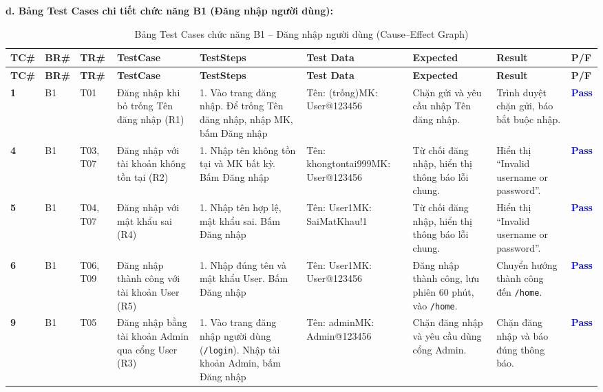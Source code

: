 \documentclass[11pt,a4paper]{article}
\begin{document}
\pagebreak
\noindent\textbf{d. Bảng Test Cases chi tiết chức năng B1 (Đăng nhập người dùng):}
\begingroup
\scriptsize
\setlength{\tabcolsep}{3pt}
\renewcommand{\arraystretch}{0.88}
\begin{longtable}{|C{0.8cm}|C{0.85cm}|C{0.95cm}|L{2.0cm}|L{3.0cm}|L{2.15cm}|L{2.6cm}|L{2.5cm}|C{0.85cm}|}
\hline
{}
\textbf{TC\#} & \textbf{BR\#} & \textbf{TR\#} & \textbf{TestCase} & \textbf{TestSteps} & \textbf{Test Data} & \textbf{Expected} & \textbf{Result} & \textbf{P/F} \tabularnewline
\hline
\endfirsthead
\hline
{}
\textbf{TC\#} & \textbf{BR\#} & \textbf{TR\#} & \textbf{TestCase} & \textbf{TestSteps} & \textbf{Test Data} & \textbf{Expected} & \textbf{Result} & \textbf{P/F} \tabularnewline
\hline
\endhead
\hline
\endfoot
\hline
\caption{Bảng Test Cases chức năng B1 -- Đăng nhập người dùng (Cause--Effect Graph)}
\endlastfoot
\textbf{1} & B1 & T01 & Đăng nhập khi bỏ trống Tên đăng nhập (R1) & 1. Vào trang đăng nhập. Để trống Tên đăng nhập, nhập MK, bấm Đăng nhập & Tên: (trống)\newline MK: User@123456 & Chặn gửi và yêu cầu nhập Tên đăng nhập. & Trình duyệt chặn gửi, báo bắt buộc nhập. & \textcolor{blue}{\textbf{Pass}} \\ \hline
\textbf{4} & B1 & T03, T07 & Đăng nhập với tài khoản không tồn tại (R2) & 1. Nhập tên không tồn tại và MK bất kỳ. Bấm Đăng nhập & Tên: khongtontai999\newline MK: User@123456 & Từ chối đăng nhập, hiển thị thông báo lỗi chung. & Hiển thị ``Invalid username or password''. & \textcolor{blue}{\textbf{Pass}} \\ \hline
\textbf{5} & B1 & T04, T07 & Đăng nhập với mật khẩu sai (R4) & 1. Nhập tên hợp lệ, mật khẩu sai. Bấm Đăng nhập & Tên: User1\newline MK: SaiMatKhau!1 & Từ chối đăng nhập, hiển thị thông báo lỗi chung. & Hiển thị ``Invalid username or password''. & \textcolor{blue}{\textbf{Pass}} \\ \hline
\textbf{6} & B1 & T06, T09 & Đăng nhập thành công với tài khoản User (R5) & 1. Nhập đúng tên và mật khẩu User. Bấm Đăng nhập & Tên: User1\newline MK: User@123456 & Đăng nhập thành công, lưu phiên 60 phút, vào \texttt{/home}. & Chuyển hướng thành công đến \texttt{/home}. & \textcolor{blue}{\textbf{Pass}} \\ \hline
\textbf{9} & B1 & T05 & Đăng nhập bằng tài khoản Admin qua cổng User (R3) & 1. Vào trang đăng nhập người dùng (\texttt{/login}). Nhập tài khoản Admin, bấm Đăng nhập & Tên: admin\newline MK: Admin@123456 & Chặn đăng nhập và yêu cầu dùng cổng Admin. & Chặn đăng nhập và báo đúng thông báo. & \textcolor{blue}{\textbf{Pass}} \\ \hline
\end{longtable}
\endgroup
\end{document}
